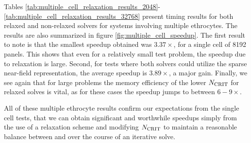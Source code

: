 Tables \ref{tab:multiple_cell_relaxation_results_2048}-\ref{tab:multiple_cell_relaxation_results_32768} present timing results for both relaxed and non-relaxed solvers for systems involving multiple ethrocytes. The results are also summarized in figure \ref{fig:multiple_cell_speedup}. The first result to note is that the smallest speedup obtained was $3.37\times$, for a single cell of 8192 panels. This shows that even for a relatively small test problem, the speedup due to relaxation is large. Second, for tests where both solvers could utilize the sparse near-field representation, the average speedup is $3.89\times$, a major gain. Finally, we see again that for large problems the memory efficiency of the lower $N_{\text{CRIT}}$ for relaxed solves is vital, as for these cases the speedup jumps to between $6-9\times$.

All of these multiple ethrocyte results confirm our expectations from the single cell tests, that we can obtain significant and worthwhile speedups simply from the use of a relaxation scheme and modifying $N_{\text{CRIT}}$ to maintain a reasonable balance between {\ptop} and {\mtol} over the course of an iterative solve.

%
%

